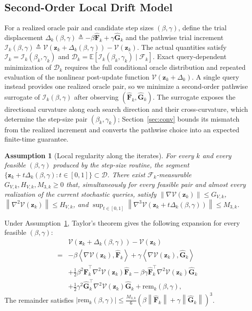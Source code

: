\documentclass[journal]{IEEEtran}
\newtheorem{assumption}{Assumption}
\theoremstyle{remark}
\newcommand{\E}{\mathbb{E}}
\newcommand{\inner}[2]{\left\langle #1,#2\right\rangle}
\newcommand{\norm}[1]{\left\lVert #1\right\rVert}
\newcommand{\cD}{\mathcal{D}}
\newcommand{\bz}{\boldsymbol{z}}
\newcommand{\hatF}{\widehat{\boldsymbol{F}}}
\newcommand{\hatG}{\widehat{\boldsymbol{G}}}
\newcommand{\Vk}{\mathcal{V}}
\begin{document}
	\subsection{Second-Order Local Drift Model}\label{subsec:two_direction}
	For a realized oracle pair and candidate step sizes $(\beta,\gamma)$, define the trial displacement $\Delta_{k}(\beta,\gamma)\triangleq -\beta\hatF_{k}+\gamma\hatG_{k}$ and the pathwise trial increment $\mathscr I_k(\beta,\gamma)\triangleq\Vk(\bz_k+\Delta_k(\beta,\gamma))-\Vk(\bz_k)$.
	The actual quantities satisfy $\mathscr I_k=\mathscr I_k(\beta_k,\gamma_k)$ and $\mathscr D_k=\E[\mathscr I_k(\beta_k,\gamma_k)\mid\mathscr F_k]$.
	Exact query-dependent minimization of $\mathscr D_k$ requires the full conditional oracle distribution and repeated evaluation of the nonlinear post-update function $\Vk(\bz_k+\Delta_k)$.
	A single query instead provides one realized oracle pair, so we minimize a second-order pathwise surrogate of $\mathscr I_k(\beta,\gamma)$ after observing $(\hatF_k,\hatG_k)$.
	The surrogate exposes the directional curvature along each search direction and their cross-curvature, which determine the step-size pair $(\beta_k,\gamma_k)$; Section~\ref{sec:conv} bounds its mismatch from the realized increment and converts the pathwise choice into an expected finite-time guarantee.
	
	\begin{assumption}[Local regularity along the iterates]\label{ass:local_reg}
		For every $k$ and every feasible $(\beta,\gamma)$ produced by the step-size routine, the segment $\{\bz_{k}+t\Delta_{k}(\beta,\gamma):t\in[0,1]\}\subset\cD$.
		There exist $\mathscr{F}_{k}$-measurable $G_{V,k},H_{V,k},M_{3,k}\ge 0$ that, simultaneously for every feasible pair and almost every realization of the current stochastic queries, satisfy $\norm{\nabla\Vk(\bz_{k})}\le G_{V,k}$, $\norm{\nabla^{2}\Vk(\bz_{k})}\le H_{V,k}$, and $\sup_{t\in[0,1]}\norm{\nabla^{3}\Vk(\bz_{k}+t\Delta_{k}(\beta,\gamma))} \le M_{3,k}$.
	\end{assumption}
	
	Under Assumption~\ref{ass:local_reg}, Taylor's theorem gives the following expansion for every feasible $(\beta,\gamma)$:
	\begin{equation}\label{eq:drift_taylor}
		\begin{aligned}
			&\Vk(\bz_{k}+\Delta_{k}(\beta,\gamma))-\Vk(\bz_{k}) \\
			={}&-\beta\inner{\nabla\Vk(\bz_k)}{\hatF_k}
			+\gamma\inner{\nabla\Vk(\bz_k)}{\hatG_k}\\
			&+\tfrac12\beta^2\hatF_k^\top\nabla^2\Vk(\bz_k)\hatF_k
			-\beta\gamma\hatF_k^\top\nabla^2\Vk(\bz_k)\hatG_k\\
			&+\tfrac12\gamma^2\hatG_k^\top\nabla^2\Vk(\bz_k)\hatG_k
			+\mathrm{rem}_{k}(\beta,\gamma),
		\end{aligned}
	\end{equation}
	The remainder satisfies $\lvert \mathrm{rem}_{k}(\beta,\gamma)\rvert\le\frac{M_{3,k}}{6}(\beta\norm{\hatF_{k}}+\gamma\norm{\hatG_{k}})^{3}$.
	
\end{document}
